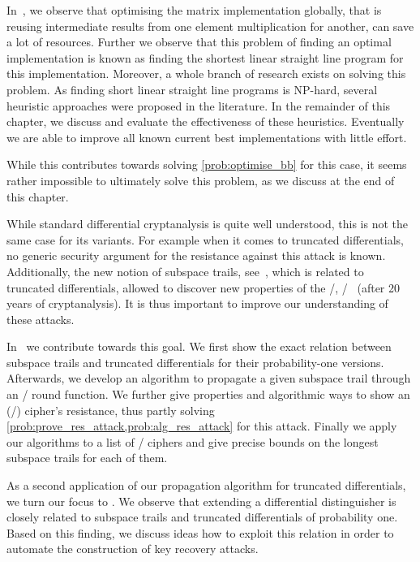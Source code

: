 In~\cite{ToSC:KLSW17}, we observe that optimising the matrix implementation globally, that is reusing intermediate results from one element multiplication for another, can save a lot of resources.
Further we observe that this problem of finding an optimal implementation is known as finding the shortest linear straight line program for this implementation.
Moreover, a whole branch of research exists on solving this problem.
As finding short linear straight line programs is NP-hard, several heuristic approaches were proposed in the literature.
In the remainder of this chapter, we discuss and evaluate the effectiveness of these heuristics.
Eventually we are able to improve all known current best implementations with little effort.

While this contributes towards solving \cref{prob:optimise_bb} for this case, it seems rather impossible to ultimately solve this problem, as we discuss at the end of this chapter.

While standard differential cryptanalysis is quite well understood, this is not the same case for its variants.
For example when it comes to truncated differentials, no generic security argument for the resistance against this attack is known.
Additionally, the new notion of subspace trails, see~\cite{ToSC:GraRecRon16}, which is related to truncated differentials, allowed to discover new properties of the \AES/, \eg/~ (after 20 years of cryptanalysis).
It is thus important to improve our understanding of these attacks.

In~\cite{ToSC:LeaTezWie18} we contribute towards this goal.
We first show the exact relation between subspace trails and truncated differentials for their probability-one versions.
Afterwards, we develop an algorithm to propagate a given subspace trail through an \SPN/ round function.
We further give properties and algorithmic ways to show an (\SPN/) cipher's resistance, thus partly solving \cref{prob:prove_res_attack,prob:alg_res_attack} for this attack.
Finally we apply our algorithms to a list of \SPN/ ciphers and give precise bounds on the longest subspace trails for each of them.

As a second application of our propagation algorithm for truncated differentials, we turn our focus to .
We observe that extending a differential distinguisher is closely related to subspace trails and truncated differentials of probability one.
Based on this finding, we discuss ideas how to exploit this relation in order to automate the construction of key recovery attacks.


